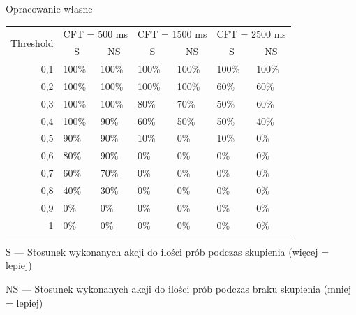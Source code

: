 \documentclass[skorowidz,skroty]{dyplomWEZUT}
\begin{document}
{Opracowanie własne}
{
    \begin{threeparttable}
        \begin{tabularx}{.95\linewidth}{r|X|X|X|X|X|X}
            \multirow{2}{*}{Threshold} & \multicolumn{2}{c|}{CFT = 500 ms} & \multicolumn{2}{c|}{CFT = 1500 ms} & \multicolumn{2}{c}{CFT = 2500 ms} \\ \cline{2-7} 
            \multicolumn{1}{c|}{} & \multicolumn{1}{c|}{S} & \multicolumn{1}{c|}{NS} & \multicolumn{1}{c|}{S} & \multicolumn{1}{c|}{NS} & \multicolumn{1}{c|}{S} & \multicolumn{1}{c}{NS} \\ \hline\hline
            0,1 & 100\% & 100\% & 100\% & 100\% & 100\% & 100\% \\ \hline
            0,2 & 100\% & 100\% & 100\% & 100\% & 60\% & 60\% \\ \hline
            0,3 & 100\% & 100\% & 80\% & 70\% & 50\% & 60\% \\ \hline
            0,4 & 100\% & 90\% & 60\% & 50\% & 50\% & 40\% \\ \hline
            0,5 & 90\% & 90\% & 10\% & 0\% & 10\% & 0\% \\ \hline
            0,6 & 80\% & 90\% & 0\% & 0\% & 0\% & 0\% \\ \hline
            0,7 & 60\% & 70\% & 0\% & 0\% & 0\% & 0\% \\ \hline
            0,8 & 40\% & 30\% & 0\% & 0\% & 0\% & 0\% \\ \hline
            0,9 & 0\% & 0\% & 0\% & 0\% & 0\% & 0\% \\ \hline
            1 & 0\% & 0\% & 0\% & 0\% & 0\% & 0\% \\
        \end{tabularx}
        \begin{tablenotes}
            \item \hphantom{N}S --- Stosunek wykonanych akcji do ilości prób podczas skupienia (więcej = lepiej)
            \item NS --- Stosunek wykonanych akcji do ilości prób podczas braku skupienia (mniej = lepiej)
        \end{tablenotes}
    \end{threeparttable}
}
\end{document}
